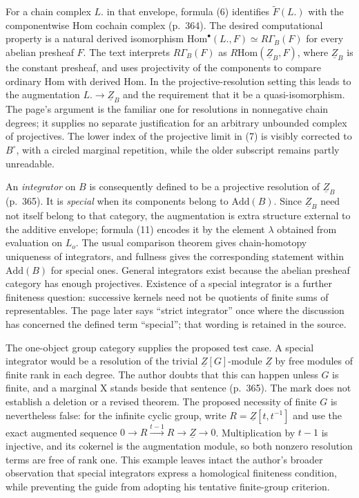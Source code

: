 For a chain complex $L.$ in that envelope, formula (6) identifies $\widetilde F(L.)$ with the componentwise Hom cochain complex (p.~364). The desired computational property is a natural derived isomorphism $\mathrm{Hom}^{\bullet}(L.,F)\simeq R\Gamma_B(F)$ for every abelian presheaf $F$. The text interprets $R\Gamma_B(F)$ as $R\mathrm{Hom}(\underline Z_B,F)$, where $\underline Z_B$ is the constant presheaf, and uses projectivity of the components to compare ordinary Hom with derived Hom. In the projective-resolution setting this leads to the augmentation $L.\to\underline Z_B$ and the requirement that it be a quasi-isomorphism. The page's argument is the familiar one for resolutions in nonnegative chain degrees; it supplies no separate justification for an arbitrary unbounded complex of projectives. The lower index of the projective limit in (7) is visibly corrected to $B^{\circ}$, with a circled marginal repetition, while the older subscript remains partly unreadable.

An \emph{integrator} on $B$ is consequently defined to be a projective resolution of $\underline Z_B$ (p.~365). It is \emph{special} when its components belong to $\mathrm{Add}(B)$. Since $\underline Z_B$ need not itself belong to that category, the augmentation is extra structure external to the additive envelope; formula (11) encodes it by the element $\lambda$ obtained from evaluation on $L_o$. The usual comparison theorem gives chain-homotopy uniqueness of integrators, and fullness gives the corresponding statement within $\mathrm{Add}(B)$ for special ones. General integrators exist because the abelian presheaf category has enough projectives. Existence of a special integrator is a further finiteness question: successive kernels need not be quotients of finite sums of representables. The page later says ``strict integrator'' once where the discussion has concerned the defined term ``special''; that wording is retained in the source.

The one-object group category supplies the proposed test case. A special integrator would be a resolution of the trivial $\underline Z[G]$-module $\underline Z$ by free modules of finite rank in each degree. The author doubts that this can happen unless $G$ is finite, and a marginal X stands beside that sentence (p.~365). The mark does not establish a deletion or a revised theorem. The proposed necessity of finite $G$ is nevertheless false: for the infinite cyclic group, write $R=\underline Z[t,t^{-1}]$ and use the exact augmented sequence $0\to R\xrightarrow{t-1}R\to\underline Z\to0$. Multiplication by $t-1$ is injective, and its cokernel is the augmentation module, so both nonzero resolution terms are free of rank one. This example leaves intact the author's broader observation that special integrators express a homological finiteness condition, while preventing the guide from adopting his tentative finite-group criterion.

